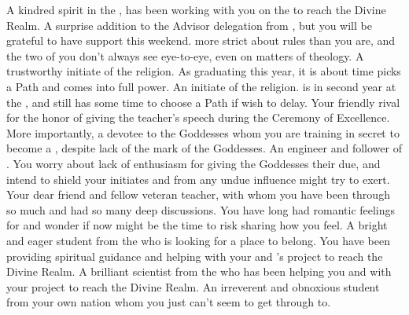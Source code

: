 \documentclass[char]{GL2020}
\begin{document}
\begin{contacts}
    \contact{\cCurse{}} A kindred spirit in the \pFarm{}, \cCurse{} has been working with you on the \iBeansMB{} to reach the Divine Realm.
    \contact{\cEbbPriest{}} A surprise addition to the Advisor delegation from \pShip{}, but you will be grateful to have \cEbbPriest{\their} support this weekend. \cEbbPriest{\They} \cEbbPriest{\are} more strict about rules than you are, and the two of you don't always see eye-to-eye, even on matters of theology.
    \contact{\cInitiate{}} A trustworthy initiate of the \pShippies{} religion. As \cInitiate{\they} \cInitiate{\are} graduating this year, it is about time \cInitiate{} picks a Path and comes into \cInitiate{\their} full power.
    \contact{\cWarlordDaughter{}} An initiate of the \pShippies{} religion. \cWarlordDaughter{} is in \cWarlordDaughter{\their} second year at the \pSc{}, and still has some time to choose a Path if \cWarlordDaughter{\they} wish\cWarlordDaughter{\verbes} to delay.
    \contact{\cPirate{}} Your friendly rival for the honor of giving the teacher's speech during the Ceremony of Excellence. More importantly, a devotee to the \pShip{} Goddesses whom you are training in secret to become a \cPirate{\cleric}, despite \cPirate{\their} lack of the mark of the Goddesses.
    \contact{\cBunker{}} An engineer and follower of \cEbb{}. You worry about \cBunker{\their} lack of enthusiasm for giving the Goddesses their due, and intend to shield your initiates \cInitiate{} and \cWarlordDaughter{} from any undue influence \cBunker{\they} might try to exert.
    \contact{\cMusic{}} Your dear friend and fellow veteran teacher, with whom you have been through so much and had so many deep discussions. You have long had romantic feelings for \cMusic{\them} and wonder if now might be the time to risk sharing how you feel.
    \contact{\cAmbition{}} A bright and eager student from the \pTech{} who is looking for a place to belong. You have been providing spiritual guidance and \cAmbition{\they} \cAmbition{\are} helping with your and \cCurse{}’s project to reach the Divine Realm. 
    \contact{\cAssistantScientist{}} A brilliant scientist from the \pTech{} who has been helping you and \cCurse{} with your project to reach the Divine Realm.
    \contact{\cPirateChild{}} An irreverent and obnoxious student from your own nation whom you just can’t seem to get through to.
\end{contacts}
\end{document}
